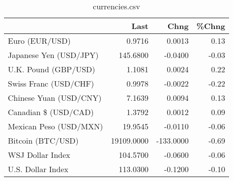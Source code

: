 \documentclass{article}%
\begin{document}
%


\begin{table}[htbp]%
\caption{currencies.csv}%
\centering%
\begin{adjustbox}{width=1\textwidth}%
\begin{tabular}{lrrr}
\toprule
                       &       Last &      Chng &  \%Chng \\
\midrule
        Euro (EUR/USD) &     0.9716 &    0.0013 &   0.13 \\
Japanese Yen (USD/JPY) &   145.6800 &   -0.0400 &  -0.03 \\
  U.K. Pound (GBP/USD) &     1.1081 &    0.0024 &   0.22 \\
 Swiss Franc (USD/CHF) &     0.9978 &   -0.0022 &  -0.22 \\
Chinese Yuan (USD/CNY) &     7.1639 &    0.0094 &   0.13 \\
  Canadian \$ (USD/CAD) &     1.3792 &    0.0012 &   0.09 \\
Mexican Peso (USD/MXN) &    19.9545 &   -0.0110 &  -0.06 \\
     Bitcoin (BTC/USD) & 19109.0000 & -133.0000 &  -0.69 \\
      WSJ Dollar Index &   104.5700 &   -0.0600 &  -0.06 \\
     U.S. Dollar Index &   113.0300 &   -0.1200 &  -0.10 \\
\bottomrule
\end{tabular}
%
\end{adjustbox}%
\end{table}

%
\end{document}

